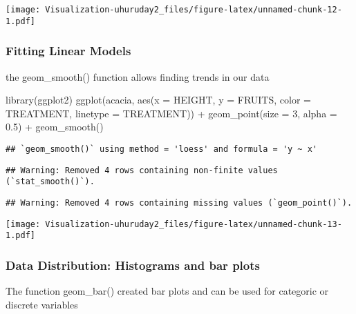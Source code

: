 \documentclass[
]{article}
\newenvironment{Shaded}{\begin{snugshade}}{\end{snugshade}}
\newcommand{\AttributeTok}[1]{\textcolor[rgb]{0.77,0.63,0.00}{#1}}
\newcommand{\DecValTok}[1]{\textcolor[rgb]{0.00,0.00,0.81}{#1}}
\newcommand{\FloatTok}[1]{\textcolor[rgb]{0.00,0.00,0.81}{#1}}
\newcommand{\FunctionTok}[1]{\textcolor[rgb]{0.00,0.00,0.00}{#1}}
\newcommand{\NormalTok}[1]{#1}
\newcommand{\SpecialCharTok}[1]{\textcolor[rgb]{0.00,0.00,0.00}{#1}}
\begin{document}
\texttt{[image: Visualization-uhuruday2\_files/figure-latex/unnamed-chunk-12-1.pdf]}

\hypertarget{fitting-linear-models}{%
\subsubsection{Fitting Linear Models}\label{fitting-linear-models}}

the geom\_smooth() function allows finding trends in our data

\begin{Shaded}
\begin{Highlighting}[]
\FunctionTok{library}\NormalTok{(ggplot2)}
\FunctionTok{ggplot}\NormalTok{(acacia, }\FunctionTok{aes}\NormalTok{(}\AttributeTok{x =}\NormalTok{ HEIGHT, }\AttributeTok{y =}\NormalTok{ FRUITS, }\AttributeTok{color =}\NormalTok{ TREATMENT, }\AttributeTok{linetype =}\NormalTok{ TREATMENT)) }\SpecialCharTok{+}
  \FunctionTok{geom\_point}\NormalTok{(}\AttributeTok{size =} \DecValTok{3}\NormalTok{, }\AttributeTok{alpha =} \FloatTok{0.5}\NormalTok{) }\SpecialCharTok{+} 
  \FunctionTok{geom\_smooth}\NormalTok{()}
\end{Highlighting}
\end{Shaded}

\begin{verbatim}
## `geom_smooth()` using method = 'loess' and formula = 'y ~ x'
\end{verbatim}

\begin{verbatim}
## Warning: Removed 4 rows containing non-finite values (`stat_smooth()`).
\end{verbatim}

\begin{verbatim}
## Warning: Removed 4 rows containing missing values (`geom_point()`).
\end{verbatim}

\texttt{[image: Visualization-uhuruday2\_files/figure-latex/unnamed-chunk-13-1.pdf]}

\hypertarget{data-distribution-histograms-and-bar-plots}{%
\subsubsection{Data Distribution: Histograms and bar
plots}\label{data-distribution-histograms-and-bar-plots}}

The function geom\_bar() created bar plots and can be used for categoric
or discrete variables
\end{document}
